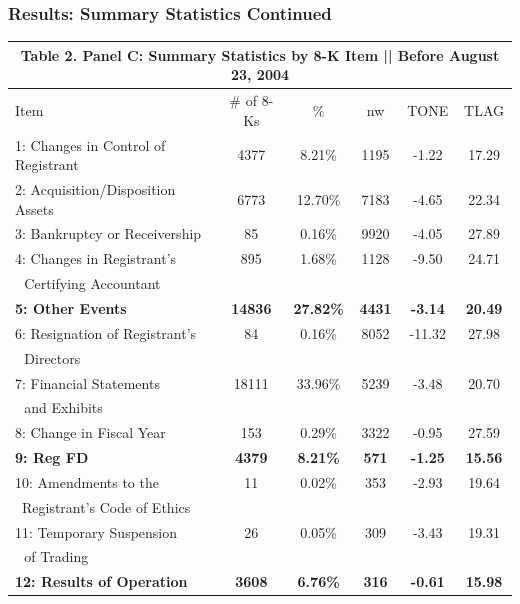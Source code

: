 \documentclass{beamer}
\begin{document}
\begin{frame}
	\frametitle{Results: Summary Statistics Continued}

\begin{table}[H]   \label{T2PC}%
	\begin{center} \scriptsize
		\begin{tabular}{lccccc}
			\multicolumn{6}{c}{\textbf{Table 2. Panel C: Summary Statistics by 8-K Item || Before August 23, 2004}} \\
			\midrule
			\midrule
			Item & \multicolumn{1}{c}{\# of 8-Ks} & \multicolumn{1}{c}{\% } & \multicolumn{1}{c}{nw} & \multicolumn{1}{c}{TONE} & \multicolumn{1}{c}{TLAG} \\
			\midrule
			1: Changes in Control of Registrant & 4377 & 8.21\% & 1195 & -1.22 & 17.29 \\
			2: Acquisition/Disposition Assets& 6773 & 12.70\% & 7183 & -4.65 & 22.34 \\
			3: Bankruptcy or Receivership & 85 & 0.16\% & 9920 & -4.05 & 27.89 \\
			4: Changes in Registrant's & 895 & 1.68\% & 1128 & -9.50 & 24.71 \\
			\: \,\, Certifying Accountant & &  &  &  & \\
			\textbf{5: Other Events} & \textbf{14836} & \textbf{27.82\%} & \textbf{4431} & \textbf{-3.14} & \textbf{20.49} \\
			6: Resignation of Registrant's & 84 & 0.16\% & 8052 & -11.32 & 27.98 \\
			\: \,\, Directors & &  &  &  & \\
			7: Financial Statements & 18111 & 33.96\% & 5239 & -3.48 & 20.70 \\
			\: \,\, and Exhibits & &  &  &  & \\
			8: Change in Fiscal Year & 153 & 0.29\% & 3322 & -0.95 & 27.59 \\
			\textbf{9: Reg FD} & \textbf{4379} & \textbf{8.21\%} & \textbf{571} & \textbf{-1.25} & \textbf{15.56} \\
			10: Amendments to the & 11 & 0.02\% & 353 & -2.93 & 19.64 \\
			\quad\:\, Registrant's Code of Ethics & &  &  &  & \\
			11: Temporary Suspension & 26 & 0.05\% & 309 & -3.43 & 19.31 \\
			\: \,\, of Trading & &  &  &  & \\
			\textbf{12: Results of Operation} & \textbf{3608} & \textbf{6.76\%} & \textbf{316} & \textbf{-0.61} & \textbf{15.98} \\
			\bottomrule
			\bottomrule
		\end{tabular}%
	\end{center}
\end{table}%


	
\end{frame}
\end{document}
